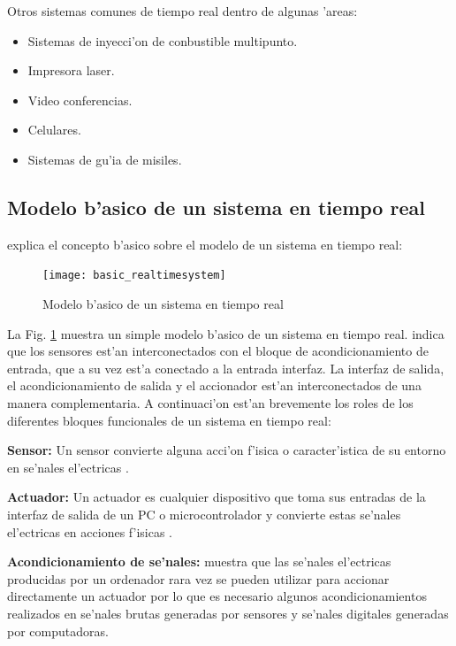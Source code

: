Otros sistemas comunes de tiempo real dentro de algunas 'areas:

\begin{itemize}
	\item Sistemas de inyecci'on de conbustible multipunto.
	\item Impresora laser.

\item Video conferencias.
\item Celulares.
\item Sistemas de gu'ia de misiles.

\end{itemize}


\subsection{Modelo b'asico de un sistema en tiempo real}
\label{sec:ABasicModelOfARealTimeSystem}

\citet{mall}  explica el concepto b'asico sobre el modelo de un sistema en tiempo real:

\begin{figure}[ht]
	\centering
		\texttt{[image: basic\_realtimesystem]}
	\caption{Modelo b'asico de un sistema en tiempo real}
	\label{fig:realtimesys}
\end{figure}

La Fig. \ref{fig:realtimesys} muestra un simple modelo b'asico de un sistema en tiempo real. \citet{mall} indica que  los sensores est'an interconectados con el bloque de acondicionamiento de entrada, que a su vez est'a conectado a la entrada interfaz. La interfaz de salida, el acondicionamiento de salida y el accionador est'an interconectados de una manera complementaria. A continuaci'on est'an brevemente los roles de los diferentes bloques funcionales de un sistema en tiempo real:

\textbf{Sensor:} Un sensor convierte alguna acci'on f'isica o caracter'istica de su entorno en se'nales el'ectricas \citep{mall}. 


\textbf{Actuador:} Un actuador es cualquier dispositivo que toma sus entradas de la interfaz de salida de un PC o microcontrolador y convierte estas se'nales el'ectricas en acciones f'isicas  \citep{mall}. 

\textbf{Acondicionamiento de se'nales:} \citet{mall} muestra que las se'nales el'ectricas producidas por un ordenador rara vez se pueden utilizar para accionar directamente un actuador por lo que es necesario algunos acondicionamientos realizados en se'nales brutas generadas por sensores y se'nales digitales generadas por computadoras.

